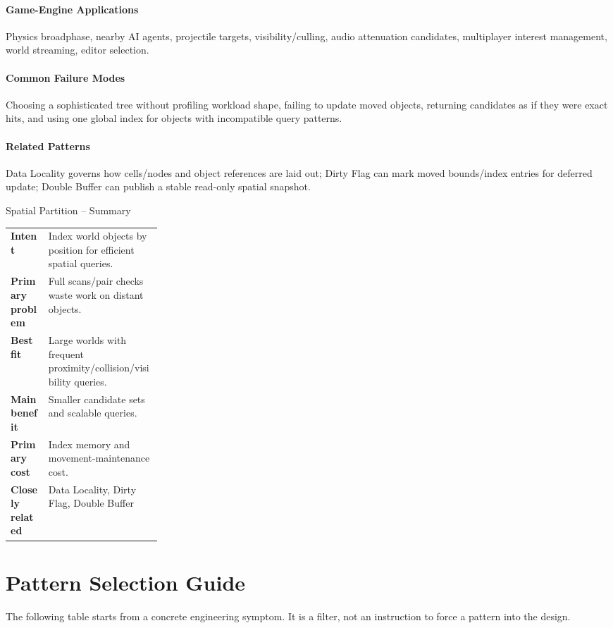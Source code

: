 \documentclass[11pt]{article}
\begin{document}
\paragraph{Game-Engine Applications} Physics broadphase, nearby AI agents, projectile targets, visibility/culling, audio attenuation candidates, multiplayer interest management, world streaming, editor selection.
\paragraph{Common Failure Modes} Choosing a sophisticated tree without profiling workload shape, failing to update moved objects, returning candidates as if they were exact hits, and using one global index for objects with incompatible query patterns.
\paragraph{Related Patterns} Data Locality governs how cells/nodes and object references are laid out; Dirty Flag can mark moved bounds/index entries for deferred update; Double Buffer can publish a stable read-only spatial snapshot.

\begin{patternsummary}{Spatial Partition -- Summary}
\begin{tabularx}{\linewidth}{@{}>{\bfseries}p{0.25\linewidth}X@{}}
Intent & Index world objects by position for efficient spatial queries. \\
Primary problem & Full scans/pair checks waste work on distant objects. \\
Best fit & Large worlds with frequent proximity/collision/visibility queries. \\
Main benefit & Smaller candidate sets and scalable queries. \\
Primary cost & Index memory and movement-maintenance cost. \\
Closely related & Data Locality, Dirty Flag, Double Buffer \\
\end{tabularx}
\end{patternsummary}


\section{Pattern Selection Guide}\label{sec:selection}
The following table starts from a concrete engineering symptom. It is a filter, not an instruction to force a pattern into the design.
\end{document}
